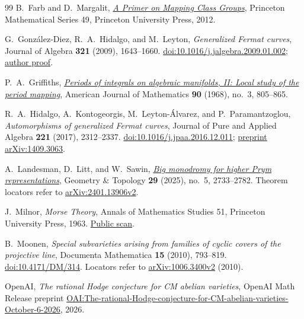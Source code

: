 \documentclass[11pt]{article}
\theoremstyle{plain}
\theoremstyle{definition}
\theoremstyle{remark}
\numberwithin{equation}{section}
\begin{document}
\begin{thebibliography}{99}
B.~Farb and D.~Margalit,
\href{https://doi.org/10.1515/9781400839049}{\emph{A Primer on Mapping Class Groups}},
Princeton Mathematical Series 49, Princeton University Press, 2012.

G.~Gonz\'alez-Diez, R.~A.~Hidalgo, and M.~Leyton,
\emph{Generalized Fermat curves},
Journal of Algebra \textbf{321} (2009), 1643--1660.
\href{https://doi.org/10.1016/j.jalgebra.2009.01.002}{doi:10.1016/j.jalgebra.2009.01.002};
\href{https://verso.mat.uam.es/~gabino.gonzalez/GenFerCurves.pdf}{author proof}.

P.~A.~Griffiths,
\href{https://doi.org/10.2307/2373485}{\emph{Periods of integrals on algebraic manifolds, II: Local study of the period mapping}},
American Journal of Mathematics \textbf{90} (1968), no.~3, 805--865.

R.~A.~Hidalgo, A.~Kontogeorgis, M.~Leyton-\'Alvarez, and
P.~Paramantzoglou,
\emph{Automorphisms of generalized Fermat curves},
Journal of Pure and Applied Algebra \textbf{221} (2017), 2312--2337.
\href{https://doi.org/10.1016/j.jpaa.2016.12.011}{doi:10.1016/j.jpaa.2016.12.011};
\href{https://arxiv.org/pdf/1409.3063}{preprint arXiv:1409.3063}.

A.~Landesman, D.~Litt, and W.~Sawin,
\href{https://doi.org/10.2140/gt.2025.29.2733}{\emph{Big monodromy for higher Prym representations}},
Geometry \& Topology \textbf{29} (2025), no.~5, 2733--2782.
Theorem locators refer to
\href{https://arxiv.org/abs/2401.13906v2}{arXiv:2401.13906v2}.

J.~Milnor,
\emph{Morse Theory},
Annals of Mathematics Studies 51,
Princeton University Press, 1963.
\href{https://math.stanford.edu/~ralph/math215b/Milnor.pdf}{Public scan}.

B.~Moonen,
\emph{Special subvarieties arising from families of cyclic covers of
the projective line},
Documenta Mathematica \textbf{15} (2010), 793--819.
\href{https://doi.org/10.4171/DM/314}{doi:10.4171/DM/314}.
Locators refer to
\href{https://arxiv.org/pdf/1006.3400v2}{arXiv:1006.3400v2} (2010).

OpenAI,
\emph{The rational Hodge conjecture for CM abelian varieties},
OpenAI Math Release preprint
\href{https://github.com/openai/math/blob/main/preprints/The-rational-Hodge-conjecture-for-CM-abelian-varieties-October-6-2026/paper.pdf}{OAI:The-rational-Hodge-conjecture-for-CM-abelian-varieties-October-6-2026},
2026.


\end{thebibliography}
\end{document}

